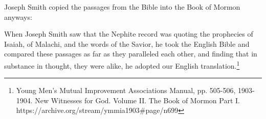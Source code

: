 Joseph Smith copied the passages from the Bible into the Book of Mormon anyways:

\begin{displayquote}
When Joseph Smith saw that the Nephite record was quoting the prophecies of Isaiah, 
of Malachi, and the words of the Savior, he took the English Bible and compared these 
passages as far as they paralleled each other, and finding that in substance in 
thought, they were alike, he adopted our English 
translation.\footnote{Young Men's Mutual Improvement Associations Manual, pp.
505-506, 1903-1904. New Witnesses for God. Volume II. The Book of Mormon Part I.
https://archive.org/stream/ymmia1903\#page/n699}
\end{displayquote}